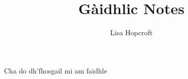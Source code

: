 \documentclass[11pt]{book}
\title{G\`{a}idhlic Notes}
\author{Lisa Hopcroft}
\begin{document}
\frontmatter
\maketitle

\tableofcontents









Cha do dh'fhosgail mi am faidhle


%
%
%
%
%
%
%




\end{document}
